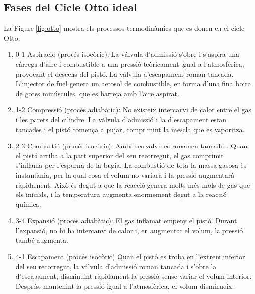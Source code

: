     \subsection{Fases del Cicle Otto ideal}

    La Figure \ref{fig:otto} mostra els processos termodinàmics que es donen en el cicle Otto\cite{morales_caracterizacion_nodate}:
\begin{enumerate}
    \item 0-1 Aspiraci\'o (proc\'es isoc\`oric): 
    La v\'alvula d'admissi\'o s'obre i s'aspira una c\`arrega d'aire i combustible a una pressi\'o te\`oricament igual a l'atmosf\`erica, provocant el descens del pist\'o. La v\'alvula d'escapament roman tancada. L'injector de fuel  genera un aerosol de combustible, en forma d'una fina boira de gotes minúscules, que es barreja amb l'aire aspirat.
    
    \item 1-2 Compressi\'o (proc\'es adiab\`atic):
    No existeix intercanvi de calor entre el gas i les parets del cilindre. La v\'alvula d'admissi\'o i la d'escapament estan tancades i el pist\'o comen\c{c}a a pujar, comprimint la mescla que es vaporitza.
    
    \item 2-3 Combusti\'o (proc\'es isoc\`oric):
    Ambdues v\'alvules romanen tancades. Quan el pist\'o arriba a la part superior del seu recorregut, el gas comprimit s'inflama per l'espurna de la bugia. La combusti\'o de tota la massa gasosa \`es instant\`ania, per la qual cosa el volum no variar\`a i la pressi\'o augmentar\`a r\`apidament. Això és degut a que la reacció genera molts més mols de gas que els inicials, i la temperatura augmenta enormement degut a la reacció química.
    
    \item 3-4 Expansi\'o (proc\'es adiab\`atic): 
    El gas inflamat empeny el pist\'o. Durant l'expansi\'o, no hi ha intercanvi de calor i, en augmentar el volum, la pressi\'o tamb\'e augmenta.
    
    \item 4-1 Escapament (proc\'es isoc\`oric)
    Quan el pist\'o es troba en l'extrem inferior del seu recorregut, la v\'alvula d'admissi\'o roman tancada i s'obre la d'escapament, disminuint r\`apidament la pressi\'o sense variar el volum interior. Despr\'es, mantenint la pressi\'o igual a l'atmosf\`erica, el volum disminueix.
\end{enumerate}
    
